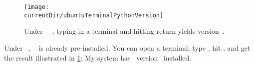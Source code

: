 %
%
\begin{figure}%
\centering%
\texttt{[image: \\currentDir/ubuntuTerminalPythonVersion]}%
\caption{Under \ubuntu\ \linux~, typing  in a \gls{terminal} and hitting return yields version~.}%
\label{fig:ubuntuTerminalPythonVersion}%
\end{figure}%
%
\begin{sloppypar}%
Under \ubuntu\ \linux, \python~ is already pre-installed.
You can open a \gls{terminal}, type , hit \keys{\return}, and get the result illustrated in \cref{fig:ubuntuTerminalPythonVersion}:%
My system has \python\ version~ installed.%
\end{sloppypar}%
%
\endhsection%
%
